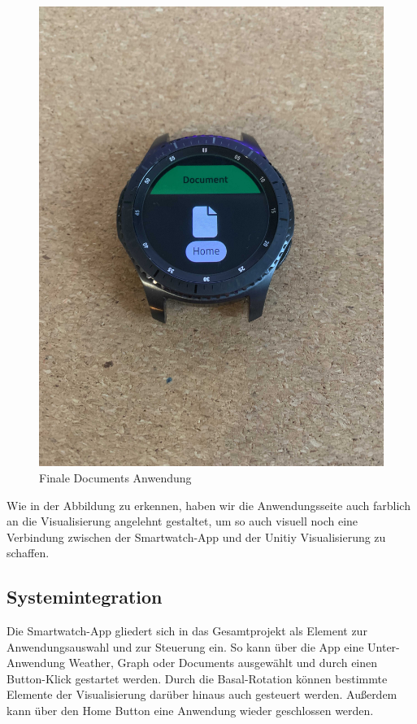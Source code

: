 \documentclass[11pt, a4paper]{article}
\begin{document}
\begin{figure}[h]
	\centering
	\includegraphics[scale=.25]{assets/smartwatch_app_zweitversion.jpg}
	\caption{Finale Documents Anwendung}
	\label{fig:app_zweitversion}
\end{figure}

Wie in der Abbildung zu erkennen, haben wir die Anwendungsseite auch farblich an die Visualisierung angelehnt gestaltet, um so auch visuell noch eine Verbindung zwischen der Smartwatch-App und der Unitiy Visualisierung zu schaffen. 

\subsection{Systemintegration}

Die Smartwatch-App gliedert sich in das Gesamtprojekt als Element zur Anwendungsauswahl und zur Steuerung ein. So kann über die App eine Unter-Anwendung Weather, Graph oder Documents ausgewählt und durch einen Button-Klick gestartet werden. Durch die Basal-Rotation können bestimmte Elemente der Visualisierung darüber hinaus auch gesteuert werden. Außerdem kann über den Home Button eine Anwendung wieder geschlossen werden. 
\end{document}
